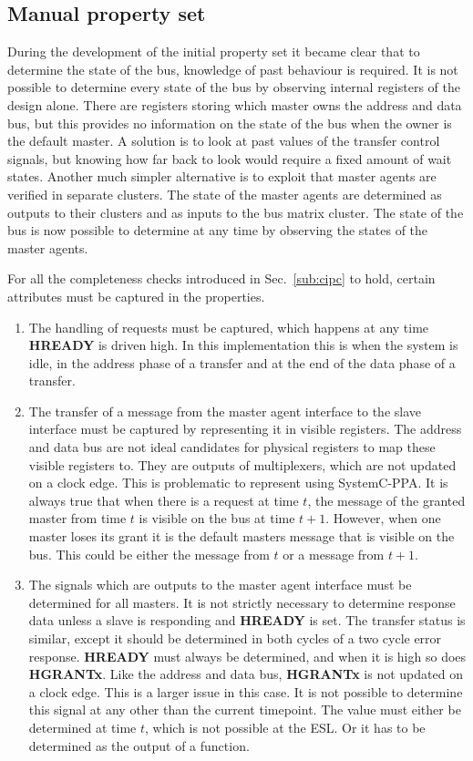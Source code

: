\subsection{Manual property set}
During the development of the initial property set it became clear that to determine the state of the bus, knowledge of past behaviour is required. It is not possible to determine every state of the bus by observing internal registers of the design alone. There are registers storing which master owns the address and data bus, but this provides no information on the state of the bus when the owner is the default master. A solution is to look at past values of the transfer  control signals, but knowing how far back to look would require a fixed amount of wait states. Another much simpler alternative is to exploit that master agents are verified in separate clusters. The state of the master agents are determined as outputs to their clusters and as inputs to the bus matrix cluster. The state of the bus is now possible to determine at any time by observing the states of the master agents. \par
For all the completeness checks introduced in Sec.~\ref{sub:cipc} to hold, certain attributes must be captured in the properties. 
\begin{enumerate}
 \item The handling of requests must be captured, which happens at any time \textbf{HREADY} is driven high. In this implementation this is when the system is idle, in the address phase of a transfer and at the end of the data phase of a transfer.
 \item The transfer of a message from the master agent interface to the slave interface must be captured by representing it in visible registers. The address and data bus are not ideal candidates for physical registers to map these visible registers to. They are outputs of multiplexers, which are not updated on a clock edge. This is problematic to represent using SystemC-PPA. It is always true that when there is a request at time $t$, the message of the granted master from time $t$ is visible on the bus at time $t+1$. However, when one master loses its grant it is the default masters message that is visible on the bus. This could be either the message from $t$ or a message from $t+1$.  
 \item The signals which are outputs to the master agent interface must be determined for all masters. It is not strictly necessary to determine response data unless a slave is responding and \textbf{HREADY} is set. The transfer status is similar, except it should be determined in both cycles of a two cycle error response. \textbf{HREADY} must always be determined, and when it is high so does \textbf{HGRANTx}. Like the address and data bus, \textbf{HGRANTx} is not updated on a clock edge. This is a larger issue in this case. It is not possible to determine this signal at any other than the current timepoint. The value must either be determined at time $t$, which is not possible at the ESL. Or it has to be determined as the output of a function. 
\end{enumerate} 

